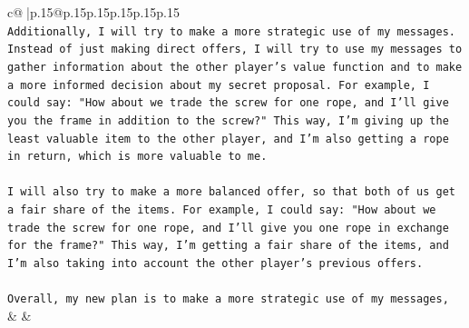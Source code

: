 \documentclass{article}
\begin{document}
{\begin{supertabular}{c@{$\;$}|p{.15\linewidth}@{}p{.15\linewidth}p{.15\linewidth}p{.15\linewidth}p{.15\linewidth}p{.15\linewidth}}
{{{\\ 
\texttt{Additionally, I will try to make a more strategic use of my messages. Instead of just making direct offers, I will try to use my messages to gather information about the other player's value function and to make a more informed decision about my secret proposal. For example, I could say: "How about we trade the screw for one rope, and I'll give you the frame in addition to the screw?" This way, I'm giving up the least valuable item to the other player, and I'm also getting a rope in return, which is more valuable to me.} \\
\\ 
\texttt{I will also try to make a more balanced offer, so that both of us get a fair share of the items. For example, I could say: "How about we trade the screw for one rope, and I'll give you one rope in exchange for the frame?" This way, I'm getting a fair share of the items, and I'm also taking into account the other player's previous offers.} \\
\\ 
\texttt{Overall, my new plan is to make a more strategic use of my messages,} \\
            }
        }
    }
    & & \\ \\


\end{supertabular}}
\end{document}
